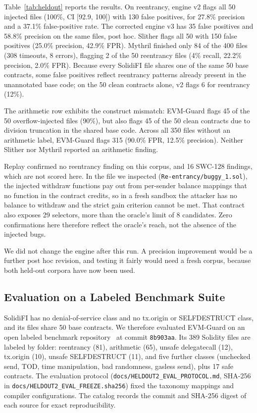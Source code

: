 \documentclass[pdflatex,sn-mathphys]{sn-jnl}
\theoremstyle{thmstyleone}
\theoremstyle{thmstyletwo}
\begin{document}
Table~\ref{tab:heldout} reports the results. On reentrancy, engine v2 flags all 50 injected files (100\%, CI [92.9, 100]) with 130 false positives, for 27.8\% precision and a 37.1\% false-positive rate. The corrected engine v3 has 35 false positives and 58.8\% precision on the same files, post hoc. Slither flags all 50 with 150 false positives (25.0\% precision, 42.9\% FPR). Mythril finished only 84 of the 400 files (308 timeouts, 8 errors), flagging 2 of the 50 reentrancy files (4\% recall, 22.2\% precision, 2.0\% FPR). Because every SolidiFI file shares one of the same 50 base contracts, some false positives reflect reentrancy patterns already present in the unannotated base code; on the 50 clean contracts alone, v2 flags 6 for reentrancy (12\%).

The arithmetic row exhibits the construct mismatch: EVM-Guard flags 45 of the 50 overflow-injected files (90\%), but also flags 45 of the 50 clean contracts due to division truncation in the shared base code. Across all 350 files without an arithmetic label, EVM-Guard flags 315 (90.0\% FPR, 12.5\% precision). Neither Slither nor Mythril reported an arithmetic finding.

Replay confirmed no reentrancy finding on this corpus, and 16 SWC-128 findings, which are not scored here. In the file we inspected (\texttt{Re-entrancy/buggy\_1.sol}), the injected withdraw functions pay out from per-sender balance mappings that no function in the contract credits, so in a fresh sandbox the attacker has no balance to withdraw and the strict gain criterion cannot be met. That contract also exposes 29 selectors, more than the oracle's limit of 8 candidates. Zero confirmations here therefore reflect the oracle's reach, not the absence of the injected bugs.

We did not change the engine after this run. A precision improvement would be a further post hoc revision, and testing it fairly would need a fresh corpus, because both held-out corpora have now been used.

\subsection{Evaluation on a Labeled Benchmark Suite}\label{sec:results:heldout2}
SolidiFI has no denial-of-service class and no tx.origin or SELFDESTRUCT class, and its files share 50 base contracts. We therefore evaluated EVM-Guard on an open labeled benchmark repository~\cite{bitsmartcontract2023benchmark} at commit \texttt{8b903aa}. Its 389 Solidity files are labeled by folder: reentrancy (81), arithmetic (65), unsafe delegatecall (12), tx.origin (10), unsafe SELFDESTRUCT (11), and five further classes (unchecked send, TOD, time manipulation, bad randomness, gasless send), plus 17 safe contracts. The evaluation protocol (\texttt{docs/HELDOUT2\_EVAL\_PROTOCOL.md}, SHA-256 in \texttt{docs/HELDOUT2\_EVAL\_FREEZE.sha256}) fixed the taxonomy mappings and compiler configurations. The catalog records the commit and SHA-256 digest of each source for exact reproducibility.
\end{document}
